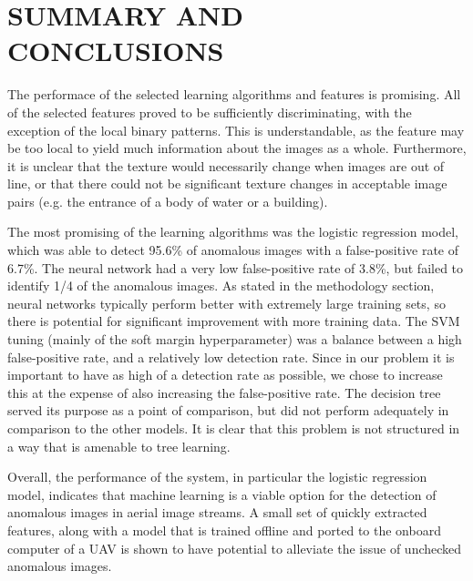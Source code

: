 %
%
%



\chapter{SUMMARY AND CONCLUSIONS \label{cha:Summary}}

The performace of the selected learning algorithms and features is promising.
All of the selected features proved to be sufficiently discriminating, with the exception of the local binary patterns.
This is understandable, as the feature may be too local to yield much information about the images as a whole.
Furthermore, it is unclear that the texture would necessarily change when images are out of line, or that there could not be significant texture changes in acceptable image pairs (e.g. the entrance of a body of water or a building).

The most promising of the learning algorithms was the logistic regression model, which was able to detect 95.6\% of anomalous images with a false-positive rate of 6.7\%.
The neural network had a very low false-positive rate of 3.8\%, but failed to identify 1/4 of the anomalous images.
As stated in the methodology section, neural networks typically perform better with extremely large training sets, so there is potential for significant improvement with more training data.
The SVM tuning (mainly of the soft margin hyperparameter) was a balance between a high false-positive rate, and a relatively low detection rate.
Since in our problem it is important to have as high of a detection rate as possible, we chose to increase this at the expense of also increasing the false-positive rate.
The decision tree served its purpose as a point of comparison, but did not perform adequately in comparison to the other models.
It is clear that this problem is not structured in a way that is amenable to tree learning.

Overall, the performance of the system, in particular the logistic regression model, indicates that machine learning is a viable option for the detection of anomalous images in aerial image streams.
A small set of quickly extracted features, along with a model that is trained offline and ported to the onboard computer of a UAV is shown to have potential to alleviate the issue of unchecked anomalous images.


